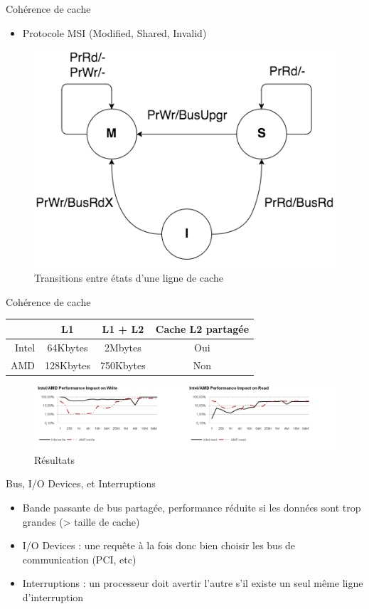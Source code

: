 \documentclass{beamer}
\begin{document}
\begin{frame}{Cohérence de cache}
	\begin{itemize}
		\item Protocole MSI (Modified, Shared, Invalid)
	\end{itemize}
	\begin{figure}
		\centering
		\includegraphics[width=0.6\linewidth]{State_diagram_for_processor_transactions.png}
		\caption{Transitions entre états d'une ligne de cache \cite{wiki:MSI_protocol}}
		\label{fig:State_di}
	\end{figure}
\end{frame}

\begin{frame}{Cohérence de cache}

	\begin{center}
		\begin{tabular}{r|ccc}
		& L1 & L1 + L2 & Cache L2 partagée \\
		\hline
			Intel & 64Kbytes & 2Mbytes & Oui \\
			AMD & 128Kbytes & 750Kbytes & Non \\
		\end{tabular}
	\end{center}

	\begin{figure}
		\centering
		\includegraphics[width=0.9\paperwidth]{results_performance_coherency.png}
		\caption{Résultats \cite{Fuch}}
		\label{fig:results_cache_sharing}
	\end{figure}	
\end{frame}

\begin{frame}{Bus, I/O Devices, et Interruptions}
	\begin{itemize}
		\item Bande passante de bus partagée, performance réduite si les données sont trop
			grandes (> taille de cache)\pause
		\item I/O Devices : une requête à la fois donc bien choisir les bus de
			communication (PCI, etc)\pause
		\item Interruptions : un processeur doit avertir l'autre s'il existe un seul même
			ligne d'interruption
	\end{itemize}
\end{frame}
\end{document}
